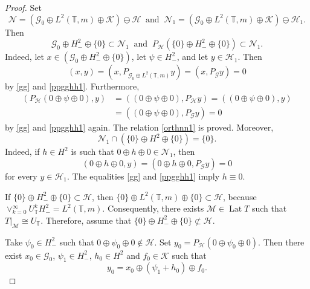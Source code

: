 \documentclass[a4paper,oneside,11pt]{amsart}
\numberwithin{equation}{section}
\theoremstyle{plain}
\theoremstyle{definition}
\begin{document}
\begin{proof}
Set
\begin{equation}\label{nn1}\mathcal N=(\mathcal G_0\oplus L^2(\mathbb T,m)\oplus\mathcal K)\ominus\mathcal H 
\ \text{ and }\  
\mathcal N_1=(\mathcal G_0\oplus L^2(\mathbb T,m)\oplus\mathcal K)\ominus\mathcal H_1. 
 \end{equation}
Then
\begin{equation}\label{orthnn1} \mathcal G_0\oplus H^2_-\oplus\{0\}\subset\mathcal N_1 \ \text{ and }\  
P_{\mathcal H}(\{0\}\oplus H^2_-\oplus \{0\})\subset\mathcal N_1.
\end{equation}
Indeed, let $x\in(\mathcal G_0\oplus H^2_-\oplus\{0\})$, let $\psi\in H^2_-$, and let $y\in\mathcal H_1$. 
Then 
\begin{equation*} (x,y)=(x,P_{\mathcal G_0\oplus L^2(\mathbb T,m)}y)=(x,P_{\mathcal G}y)=0
\end{equation*}
 by \eqref{gg} and  \eqref{ppgghh1}. Furthermore, 
\begin{align*}
(P_{\mathcal H}(0\oplus \psi\oplus 0),y)&=((0\oplus \psi\oplus 0),P_{\mathcal H}y)=
((0\oplus \psi\oplus 0),y)\\&
=((0\oplus \psi\oplus 0),P_{\mathcal G}y)=0
\end{align*}
by \eqref{gg} and  \eqref{ppgghh1} again. The relation \eqref{orthnn1} is proved. 
Moreover, 
\begin{equation} \label{hh2} \mathcal N_1\cap(\{0\}\oplus H^2\oplus\{0\})=\{0\}.
\end{equation} 
Indeed, if $ h\in H^2$  is such that $0\oplus h\oplus 0\in\mathcal N_1$,  then  
\begin{equation*} (0\oplus h\oplus 0, y)=(0\oplus h\oplus 0, P_{\mathcal G}y)=0 
\end{equation*} 
for every $y\in\mathcal H_1$. The equalities \eqref{gg} and  \eqref{ppgghh1} imply 
$h\equiv 0$.

If $\{0\}\oplus H^2_-\oplus \{0\}\subset\mathcal H$, then  $\{0\}\oplus L^2(\mathbb T,m)\oplus \{0\}\subset\mathcal H$,
 because $\vee_{k=0}^\infty U_{\mathbb T}^kH^2_-=L^2(\mathbb T,m)$. Consequently, 
 there exists $\mathcal M\in \operatorname{Lat}T$ such that  $T|_{\mathcal M}\cong U_{\mathbb T}$.
Therefore, assume that  $\{0\}\oplus H^2_-\oplus \{0\}\not\subset\mathcal H$.

Take $\psi_0\in H^2_-$ such that $0\oplus\psi_0\oplus 0\not\in\mathcal H$. 
Set $y_0=P_{\mathcal H}(0\oplus\psi_0\oplus 0)$. Then there exist $x_0\in\mathcal G_0$, $\psi_1\in H^2_-$, 
$h_0\in H^2$ and  $f_0\in\mathcal K$ such that 
\begin{equation}\label{y0}y_0=x_0\oplus(\psi_1+h_0)\oplus f_0. 
\end{equation}


\end{proof}
\end{document}
